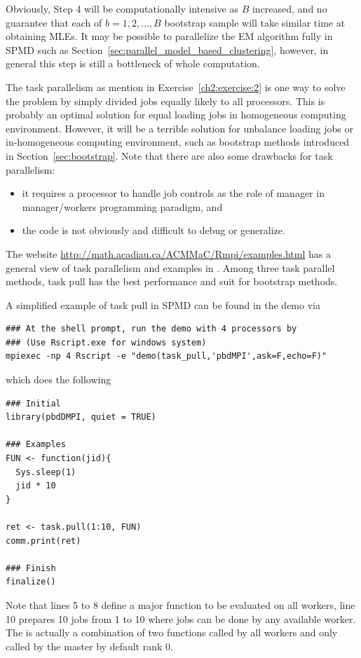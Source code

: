 Obviously, Step 4 will be computationally intensive as $B$ increased,
and no guarantee that each of $b = 1,2,\ldots, B$ bootstrap sample
will take similar time at obtaining MLEs. It may be possible to parallelize
the EM algorithm fully in SPMD such as
Section~\ref{sec:parallel_model_based_clustering},
however, in general this step is still a bottleneck of whole computation.

The task parallelism
as mention in Exercise~\ref{ch2:exercise:2}
is one way to solve the problem by simply divided jobs equally likely
to all processors.
This is probably an optimal solution for equal loading jobs
in homogeneous computing environment. However, it
will be a terrible solution for unbalance loading jobs or in-homogeneous
computing environment, such as
bootstrap methods introduced in Section~\ref{sec:bootstrap}.
Note that there are also some drawbacks for task parallelism:
\begin{itemize}
\item
it requires a processor to handle job controls as the role of manager in
manager/workers programming paradigm,
and
\item
the code is not obviously and difficult to debug or generalize.
\end{itemize}

The website
\href{http://math.acadiau.ca/ACMMaC/Rmpi/examples.html}{
http://math.acadiau.ca/ACMMaC/Rmpi/examples.html}
has a general view of task parallelism and examples in .
Among three task parallel methods, task pull has the best performance and
suit for bootstrap methods.

A simplified example of task pull in SPMD can be found in the 
demo via
\begin{lstlisting}
### At the shell prompt, run the demo with 4 processors by
### (Use Rscript.exe for windows system)
mpiexec -np 4 Rscript -e "demo(task_pull,'pbdMPI',ask=F,echo=F)"
\end{lstlisting}
which does the following
\begin{lstlisting}[language=rr,title=Task Pull Example]
### Initial
library(pbdDMPI, quiet = TRUE)

### Examples
FUN <- function(jid){
  Sys.sleep(1)
  jid * 10
}

ret <- task.pull(1:10, FUN)
comm.print(ret)

### Finish
finalize()
\end{lstlisting}
Note that lines 5 to 8 define a major function to be evaluated on all workers,
line 10 prepares 10 jobs from 1 to 10 where jobs can be done by any
available worker. The  is actually a combination of two
functions  called by all workers and
 only called by the master by default rank 0.


